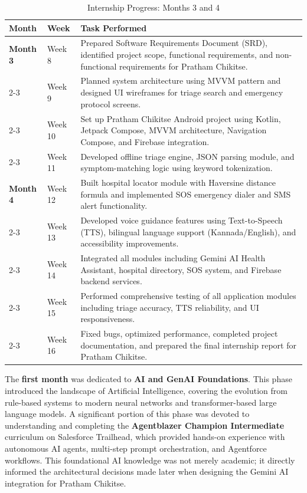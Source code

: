 \documentclass[12pt,a4paper]{report}
\begin{document}
\begin{table}[H]
\centering
\noindent\begin{tabularx}{\textwidth}{|l|l|X|}
\hline
\rowcolor[gray]{0.9} \textbf{Month} & \textbf{Week} & \textbf{Task Performed} \\ \hline
\textbf{Month 3} & Week 8 & Prepared Software Requirements Document (SRD), identified project scope, functional requirements, and non-functional requirements for Pratham Chikitse. \\ \cline{2-3} 
 & Week 9 & Planned system architecture using MVVM pattern and designed UI wireframes for triage search and emergency protocol screens. \\ \cline{2-3} 
 & Week 10 & Set up Pratham Chikitse Android project using Kotlin, Jetpack Compose, MVVM architecture, Navigation Compose, and Firebase integration. \\ \cline{2-3} 
 & Week 11 & Developed offline triage engine, JSON parsing module, and symptom-matching logic using keyword tokenization. \\ \hline
\textbf{Month 4} & Week 12 & Built hospital locator module with Haversine distance formula and implemented SOS emergency dialer and SMS alert functionality. \\ \cline{2-3} 
 & Week 13 & Developed voice guidance features using Text-to-Speech (TTS), bilingual language support (Kannada/English), and accessibility improvements. \\ \cline{2-3} 
 & Week 14 & Integrated all modules including Gemini AI Health Assistant, hospital directory, SOS system, and Firebase backend services. \\ \cline{2-3} 
 & Week 15 & Performed comprehensive testing of all application modules including triage accuracy, TTS reliability, and UI responsiveness. \\ \cline{2-3} 
 & Week 16 & Fixed bugs, optimized performance, completed project documentation, and prepared the final internship report for Pratham Chikitse. \\ \hline
\end{tabularx}
\caption{Internship Progress: Months 3 and 4}
\end{table}

\vspace{0.4cm}

\vspace{0.4cm}

The \textbf{first month} was dedicated to \textbf{AI and GenAI Foundations}. This phase introduced the landscape of Artificial Intelligence, covering the evolution from rule-based systems to modern neural networks and transformer-based large language models. A significant portion of this phase was devoted to understanding and completing the \textbf{Agentblazer Champion Intermediate} curriculum on Salesforce Trailhead, which provided hands-on experience with autonomous AI agents, multi-step prompt orchestration, and Agentforce workflows. This foundational AI knowledge was not merely academic; it directly informed the architectural decisions made later when designing the Gemini AI integration for Pratham Chikitse.
\end{document}
